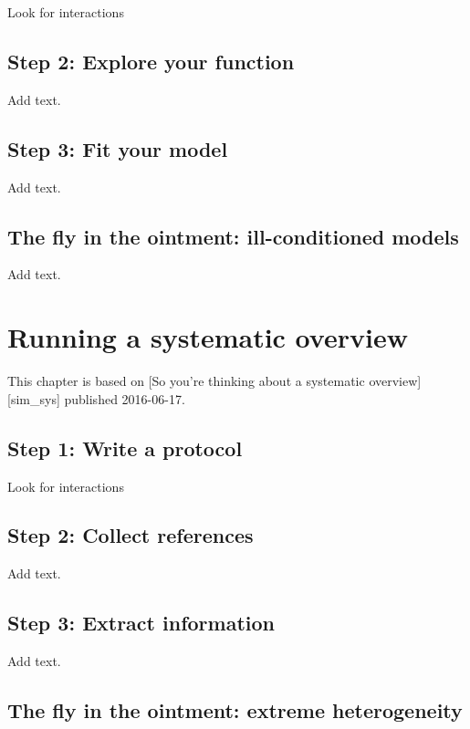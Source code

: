\documentclass[
  letterpaper,
  DIV=11,
  numbers=noendperiod]{scrreprt}
\begin{document}
Look for interactions

\section{Step 2: Explore your
function}\label{step-2-explore-your-function}

Add text.

\section{Step 3: Fit your model}\label{step-3-fit-your-model}

Add text.

\section{The fly in the ointment: ill-conditioned
models}\label{the-fly-in-the-ointment-ill-conditioned-models}

Add text.


\chapter{Running a systematic
overview}\label{running-a-systematic-overview}

This chapter is based on {[}So you're thinking about a systematic
overview{]}{[}sim\_sys{]} published 2016-06-17.

\section{Step 1: Write a protocol}\label{step-1-write-a-protocol}

Look for interactions

\section{Step 2: Collect references}\label{step-2-collect-references}

Add text.

\section{Step 3: Extract information}\label{step-3-extract-information}

Add text.

\section{The fly in the ointment: extreme
heterogeneity}\label{the-fly-in-the-ointment-extreme-heterogeneity}
\end{document}
